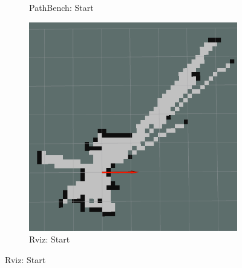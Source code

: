 \begin{figure}[h!]
\begin{subfigure}[b]{0.32\linewidth}
     \caption{PathBench: Start}
  \end{subfigure}
  \hfill
  \begin{subfigure}[b]{0.32\linewidth}
    \includegraphics[width=\linewidth]{images/real/sys/start_3.png}
     \caption{Rviz: Start}
  \end{subfigure}
  
  \newline
  

\end{figure}
